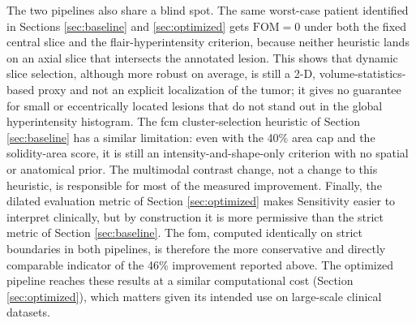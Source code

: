 The two pipelines also share a blind spot. The same worst-case patient identified in Sections \ref{sec:baseline} and \ref{sec:optimized} gets $\mathrm{FOM}=0$ under both the fixed central slice and the \gls{flair}-hyperintensity criterion, because neither heuristic lands on an axial slice that intersects the annotated lesion. This shows that dynamic slice selection, although more robust on average, is still a 2-D, volume-statistics-based proxy and not an explicit localization of the tumor; it gives no guarantee for small or eccentrically located lesions that do not stand out in the global hyperintensity histogram. The \gls{fcm} cluster-selection heuristic of Section \ref{sec:baseline} has a similar limitation: even with the 40\% area cap and the solidity-area score, it is still an intensity-and-shape-only criterion with no spatial or anatomical prior. The multimodal contrast change, not a change to this heuristic, is responsible for most of the measured improvement. Finally, the dilated evaluation metric of Section \ref{sec:optimized} makes Sensitivity easier to interpret clinically, but by construction it is more permissive than the strict metric of Section \ref{sec:baseline}. The \gls{fom}, computed identically on strict boundaries in both pipelines, is therefore the more conservative and directly comparable indicator of the 46\% improvement reported above. The optimized pipeline reaches these results at a similar computational cost (Section \ref{sec:optimized}), which matters given its intended use on large-scale clinical datasets.